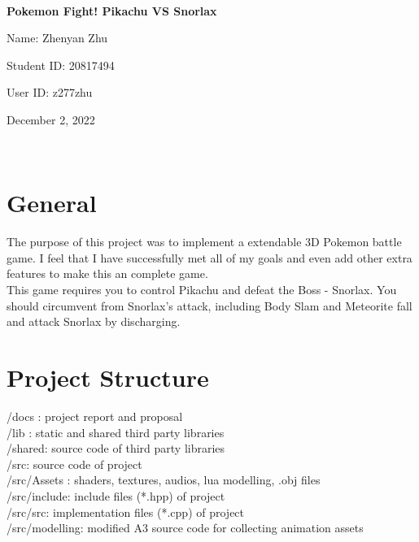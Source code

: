 \documentclass {article}
\begin{document}
~\vfill
\begin{center}
\Large


\textbf{Pokemon Fight! Pikachu VS Snorlax}

Name: Zhenyan Zhu

Student ID: 20817494

User ID: z277zhu

December 2, 2022
\end{center}
\vfill ~\vfill~
\newpage
\section{General}
The purpose of this project was to implement a extendable 3D Pokemon battle game. I feel that I have
successfully met all of my goals and even add other extra features to make this an complete game. \\
This game requires you to control Pikachu and defeat the Boss - Snorlax. You should circumvent from Snorlax's attack, including
Body Slam and Meteorite fall and attack Snorlax by discharging.


\section{Project Structure}
    /docs : project report and proposal \\
    /lib : static and shared third party libraries  \\
    /shared: source code of third party libraries \\
    /src: source code of project \\
    \indent /src/Assets : shaders, textures, audios, lua modelling, .obj files \\
    \indent /src/include: include files (*.hpp) of project \\
    \indent /src/src: implementation files (*.cpp) of project \\
    \indent /src/modelling: modified A3 source code for collecting animation assets 
\end{document}
